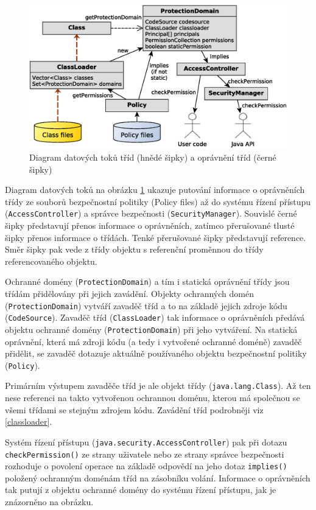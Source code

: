 \begin{figure}[ht]
  \centering
  \includegraphics[width=14cm]{fig/domain-schema}
  \caption{Diagram datových toků tříd (hnědé šipky) a oprávnění tříd (černé šipky)}
  \label{diagramDatovychToku}
\end{figure}

Diagram datových toků na obrázku \ref{diagramDatovychToku} ukazuje putování informace o oprávněních třídy ze souborů bezpečnostní politiky (Policy files) až do systému řízení přístupu ({\tt AccessController}) a správce bezpečnosti ({\tt SecurityManager}). Souvislé černé šipky představují přenos informace o oprávněních, zatímco přerušované tlusté šipky přenos informace o třídách. Tenké přerušované šipky představují reference. Směr šipky pak vede z třídy objektu s referenční proměnnou do třídy referencovaného objektu.

Ochranné domény ({\tt ProtectionDomain}) a tím i statická oprávnění třídy jsou třídám přidělovány při jejich zavádění.
Objekty ochranných domén ({\tt ProtectionDomain}) vytváří zavaděč tříd a to na základě jejich zdroje kódu ({\tt CodeSource}).
Zavaděč tříd ({\tt ClassLoader}) tak informace o oprávněních předává objektu ochranné domény ({\tt ProtectionDomain}) při jeho vytváření.
Na statická oprávnění, která má zdroji kódu (a tedy i vytvořené ochranné doméně) zavaděč přidělit, se zavaděč dotazuje aktuálně používaného objektu bezpečnostní politiky ({\tt Policy}).

Primárním výstupem zavaděče tříd je ale objekt třídy ({\tt java.lang.Class}).
Až ten nese referenci na takto vytvořenou ochrannou doménu, kterou má společnou se všemi třídami se stejným zdrojem kódu.
Zavádění tříd podrobněji viz \ref{classloader}.

Systém řízení přístupu ({\tt java.security.AccessController}) pak při dotazu {\tt checkPermission()} ze strany uživatele nebo ze strany správce bezpečnosti rozhoduje o povolení operace na základě odpovědí na jeho dotaz {\tt implies()} položený ochranným doménám tříd na zásobníku volání.
Informace o oprávněních tak putují z objektu ochranné domény do systému řízení přístupu, jak je znázorněno na obrázku.

